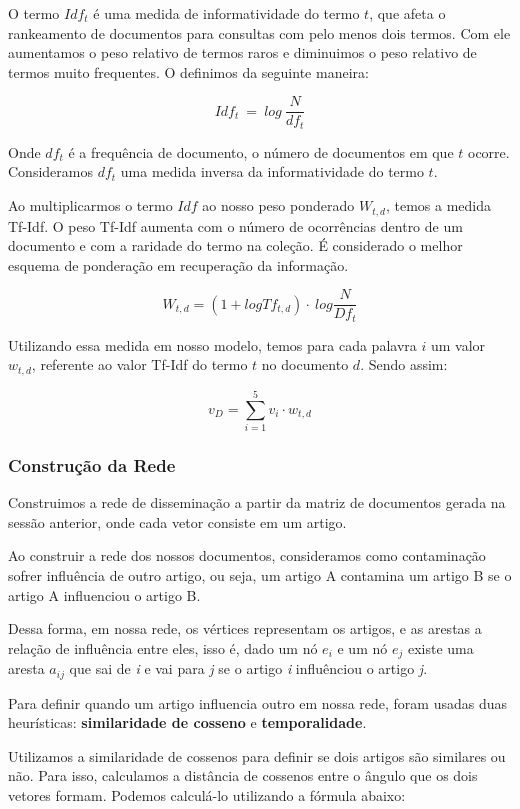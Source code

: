 \documentclass[a4paper,12pt]{article}
\begin{document}
  O termo $Idf_{t}$ é uma medida de informatividade do termo $t$, que afeta o rankeamento de documentos para consultas com pelo menos dois
  termos. Com ele aumentamos o peso relativo de termos raros e diminuimos o peso relativo
  de termos muito frequentes. O definimos da seguinte maneira:
  
  $$ Idf_{t}\ = \ log\ \frac{N}{df_{t}}$$
  
  Onde $df_{t}$ é a frequência de documento, o número de documentos em que $t$ ocorre. Consideramos $df_{t}$ uma medida inversa da informatividade
  do termo $t$.
  
  Ao multiplicarmos o termo $Idf$ ao nosso peso ponderado $W_{t,d}$, temos a medida Tf-Idf. O peso Tf-Idf aumenta com o número de ocorrências
  dentro de um documento e com a raridade do termo na coleção. É considerado o melhor esquema de ponderação em recuperação da informação.
  
  $$ W_{t,d} = (1 + log Tf_{t,d}) \cdot \ log \dfrac{N}{Df_{t}}$$


 Utilizando essa medida em nosso modelo, temos para cada palavra $i$ um valor $w_{t,d}$, referente
  ao valor Tf-Idf do termo $t$ no documento $d$. Sendo assim:
  
  $$v_{D} = \sum_{i=1}^{5} v_{i} \cdot w_{t,d} $$


\subsubsection{Construção da Rede}

 Construimos a rede de disseminação a partir da matriz de documentos gerada na sessão anterior, onde cada vetor consiste em um artigo.
 
 Ao construir a rede dos nossos documentos,
 consideramos como contaminação sofrer influência de outro artigo, ou seja, um artigo A contamina um artigo B se o artigo A influenciou o
 artigo B.
 
 Dessa forma, em nossa rede, os vértices representam os artigos, e as arestas a relação de influência entre eles, isso é, dado um nó $e_{i}$ e um nó
 $e_{j}$ existe uma aresta $a_{ij}$ que sai de \textit{i} e vai para \textit{j} se o artigo \textit{i} influênciou o artigo \textit{j}.
 
 Para definir quando um artigo influencia outro em nossa rede, foram usadas duas heurísticas: \textbf{similaridade de cosseno} e 
 \textbf{temporalidade}.
 
 Utilizamos a similaridade de cossenos para definir se dois artigos são similares ou não. Para isso, calculamos a distância de cossenos
 entre o ângulo que os dois vetores formam. Podemos calculá-lo utilizando a fórmula abaixo:
 
\end{document}
